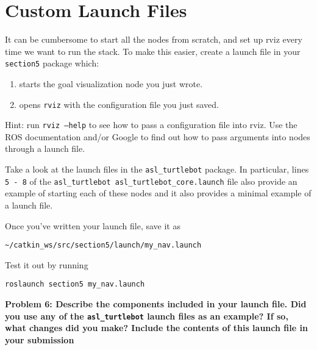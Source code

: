 \documentclass{article}
\begin{document}
\section{Custom Launch Files}
It can be cumbersome to start all the nodes from scratch, and set up rviz every time we want to run the stack. To make this easier, create a launch file in your \texttt{section5} package which:
\begin{enumerate}
    \item starts the goal visualization node you just wrote.
    \item opens \texttt{rviz} with the configuration file you just saved.
\end{enumerate}

Hint: run \texttt{rviz --help} to see how to pass a configuration file into rviz.
Use the ROS documentation and/or Google to find out how to pass arguments into nodes through a launch file.

Take a look at the launch files in the \texttt{asl\_turtlebot} package. In particular, lines \texttt{5 - 8} of the \texttt{asl\_turtlebot asl\_turtlebot\_core.launch} file also provide an example of starting each of these nodes and it also provides a minimal example of a launch file.

Once you've written your launch file, save it as


\begin{lstlisting}
~/catkin_ws/src/section5/launch/my_nav.launch
\end{lstlisting}


Test it out by running


\begin{lstlisting}
roslaunch section5 my_nav.launch
\end{lstlisting}


\textbf{Problem 6: Describe the components included in your launch file. Did you use any of the \texttt{asl\_turtlebot} launch files as an example? If so, what changes did you make? Include the contents of this launch file in your submission}
\end{document}
